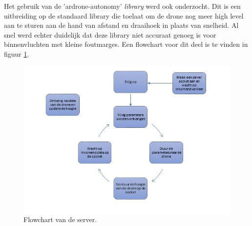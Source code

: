 Het gebruik van de 'ardrone-autonomy' \textit{library} werd ook onderzocht. Dit is een uitbreiding op de standaard library die toelaat om de drone nog meer high level aan te sturen aan de hand van afstand en draaihoek in plaats van snelheid. Al snel werd echter duidelijk dat deze library niet accuraat genoeg is  voor binnenvluchten met kleine foutmarges. Een flowchart voor dit deel is te vinden in figuur \ref{fig:flowchart_server}.
\begin{figure}[p]
	\centering
	\includegraphics[width=\textwidth]{images/node_server_flowchart}
	\caption[Flowchart van de server]{Flowchart van de server.}
	\label{fig:flowchart_server}
\end{figure}

